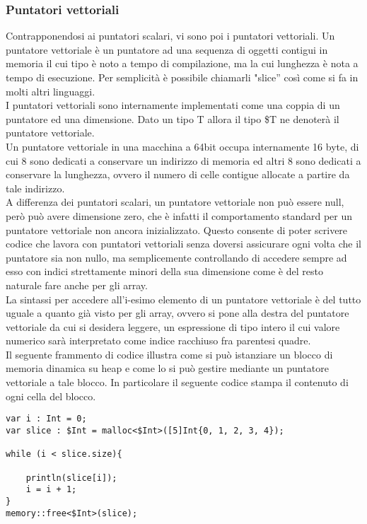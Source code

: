 \subsubsection{Puntatori vettoriali}
Contrapponendosi ai puntatori scalari, vi sono poi i puntatori vettoriali. Un puntatore vettoriale è un puntatore ad una sequenza 
di oggetti contigui in memoria il cui tipo è noto a tempo di compilazione, ma la cui lunghezza è nota a tempo di esecuzione. Per 
semplicità è possibile chiamarli "slice” così come si fa in molti altri linguaggi. \\

I puntatori vettoriali sono internamente implementati come una coppia di un puntatore ed una dimensione.  Dato un tipo T allora il tipo \$T ne denoterà 
il puntatore vettoriale. \\

Un puntatore vettoriale in una macchina a 64bit occupa internamente 16 byte, di cui 8 sono dedicati a conservare un 
indirizzo di memoria ed altri 8 sono dedicati a conservare la lunghezza, ovvero il numero di celle contigue allocate a partire da tale indirizzo. \\

A differenza dei puntatori scalari, un puntatore vettoriale non può essere null, però può avere dimensione zero, che è infatti il comportamento 
standard per un puntatore vettoriale non ancora inizializzato. Questo consente di poter scrivere codice che lavora con puntatori vettoriali senza 
doversi assicurare ogni volta che il puntatore sia non nullo, ma semplicemente controllando di accedere sempre ad esso con indici 
strettamente minori della sua dimensione come è del resto naturale fare anche per gli array. \\

La sintassi per accedere all’i-esimo elemento di un puntatore vettoriale è del tutto uguale a quanto già 
visto per gli array, ovvero si pone alla destra del puntatore vettoriale da cui si desidera leggere, un espressione di tipo intero il 
cui valore numerico sarà interpretato come indice racchiuso fra parentesi quadre. \\

Il seguente frammento di codice illustra come si può istanziare un blocco di memoria dinamica su heap e come lo 
si può gestire mediante un puntatore vettoriale a tale blocco. In particolare il seguente codice stampa il contenuto di ogni cella del 
blocco. \\

\vspace{0.5cm}
\begin{lstlisting}[frame=single]
var i : Int = 0;
var slice : $Int = malloc<$Int>([5]Int{0, 1, 2, 3, 4});

while (i < slice.size){

    println(slice[i]);
    i = i + 1;
}
memory::free<$Int>(slice);
\end{lstlisting}
\vspace{0.5cm}


